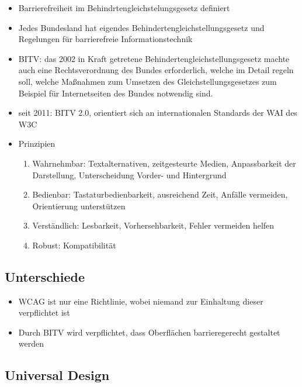 \documentclass[paper=a4, fontsize=11pt]{scrartcl} %
\numberwithin{equation}{section} %
\numberwithin{figure}{section} %
\numberwithin{table}{section} %
\begin{document}
\begin{itemize}
\item Barrierefreiheit im Behindrtengleichstelungsgesetz definiert
\item Jedes Bundesland hat eigendes Behindertengleichstellungsgesetz und Regelungen für barrierefreie Informationstechnik
\item BITV: das 2002 in Kraft getretene Behindertengleichstellungsgesetz machte auch eine Rechtsverordnung des Bundes erforderlich, welche im Detail regeln soll, welche Maßnahmen zum Umsetzen des Gleichstellungsgesetzes zum Beispiel für Internetseiten des Bundes notwendig sind.
\item seit 2011: BITV 2.0, orientiert sich an internationalen Standards der WAI des W3C
\item Prinzipien
\begin{enumerate}
\item Wahrnehmbar: Textalternativen, zeitgesteurte Medien, Anpassbarkeit der Darstellung, Unterscheidung Vorder- und Hintergrund
\item Bedienbar: Tastaturbedienbarkeit, ausreichend Zeit, Anfälle vermeiden, Orientierung unterstützen
\item Verständlich: Lesbarkeit, Vorhersehbarkeit, Fehler vermeiden helfen
\item Robust: Kompatibilität
\end{enumerate}
\end{itemize}

\subsection{Unterschiede}

\begin{itemize}
\item WCAG ist nur eine Richtlinie, wobei niemand zur Einhaltung dieser verpflichtet ist
\item Durch BITV wird verpflichtet, dass Oberflächen barrieregerecht gestaltet werden
\end{itemize}

\subsection{Universal Design}
\end{document}
